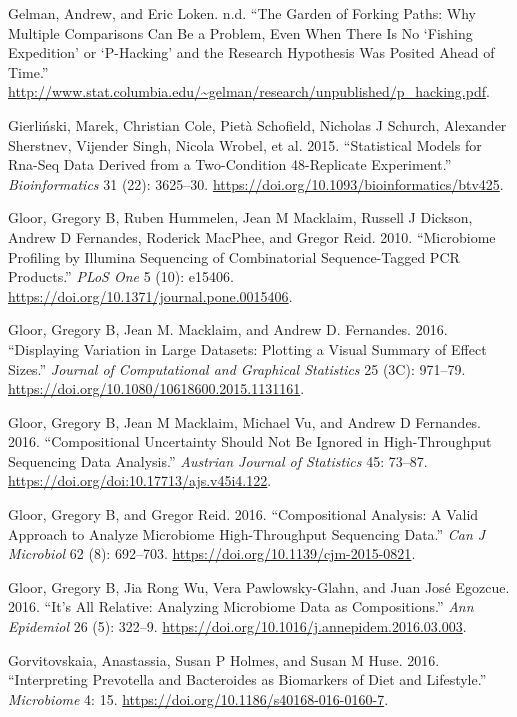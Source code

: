 \documentclass[onecolumn]{article}
\begin{document}
\leavevmode\hypertarget{ref-forking:2013}{}%
Gelman, Andrew, and Eric Loken. n.d. ``The Garden of Forking Paths: Why Multiple Comparisons Can Be a Problem, Even When There Is No `Fishing Expedition' or `P-Hacking' and the Research Hypothesis Was Posited Ahead of Time.'' \url{http://www.stat.columbia.edu/~gelman/research/unpublished/p_hacking.pdf}.

\leavevmode\hypertarget{ref-Gierlinski:2015aa}{}%
Gierliński, Marek, Christian Cole, Pietà Schofield, Nicholas J Schurch, Alexander Sherstnev, Vijender Singh, Nicola Wrobel, et al. 2015. ``Statistical Models for Rna-Seq Data Derived from a Two-Condition 48-Replicate Experiment.'' \emph{Bioinformatics} 31 (22): 3625--30. \url{https://doi.org/10.1093/bioinformatics/btv425}.

\leavevmode\hypertarget{ref-Gloor:2010}{}%
Gloor, Gregory B, Ruben Hummelen, Jean M Macklaim, Russell J Dickson, Andrew D Fernandes, Roderick MacPhee, and Gregor Reid. 2010. ``Microbiome Profiling by Illumina Sequencing of Combinatorial Sequence-Tagged PCR Products.'' \emph{PLoS One} 5 (10): e15406. \url{https://doi.org/10.1371/journal.pone.0015406}.

\leavevmode\hypertarget{ref-gloor:effect}{}%
Gloor, Gregory B, Jean M. Macklaim, and Andrew D. Fernandes. 2016. ``Displaying Variation in Large Datasets: Plotting a Visual Summary of Effect Sizes.'' \emph{Journal of Computational and Graphical Statistics} 25 (3C): 971--79. \url{https://doi.org/10.1080/10618600.2015.1131161}.

\leavevmode\hypertarget{ref-gloorAJS:2016}{}%
Gloor, Gregory B, Jean M Macklaim, Michael Vu, and Andrew D Fernandes. 2016. ``Compositional Uncertainty Should Not Be Ignored in High-Throughput Sequencing Data Analysis.'' \emph{Austrian Journal of Statistics} 45: 73--87. \url{https://doi.org/doi:10.17713/ajs.v45i4.122}.

\leavevmode\hypertarget{ref-Gloor:2016cjm}{}%
Gloor, Gregory B, and Gregor Reid. 2016. ``Compositional Analysis: A Valid Approach to Analyze Microbiome High-Throughput Sequencing Data.'' \emph{Can J Microbiol} 62 (8): 692--703. \url{https://doi.org/10.1139/cjm-2015-0821}.

\leavevmode\hypertarget{ref-gloor2016s}{}%
Gloor, Gregory B, Jia Rong Wu, Vera Pawlowsky-Glahn, and Juan José Egozcue. 2016. ``It's All Relative: Analyzing Microbiome Data as Compositions.'' \emph{Ann Epidemiol} 26 (5): 322--9. \url{https://doi.org/10.1016/j.annepidem.2016.03.003}.

\leavevmode\hypertarget{ref-Gorvitovskaia:2016aa}{}%
Gorvitovskaia, Anastassia, Susan P Holmes, and Susan M Huse. 2016. ``Interpreting Prevotella and Bacteroides as Biomarkers of Diet and Lifestyle.'' \emph{Microbiome} 4: 15. \url{https://doi.org/10.1186/s40168-016-0160-7}.
\end{document}
